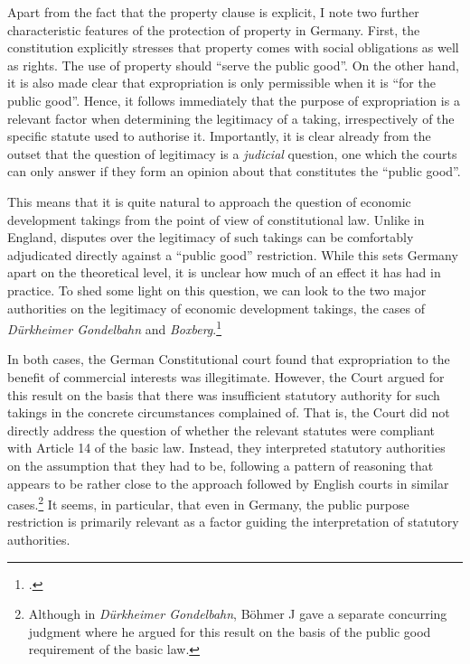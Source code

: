 \documentclass[12pt,a4paper]{book} %
\begin{document}
Apart from the fact that the property clause is explicit, I note two further characteristic features of the protection of property in Germany. First, the constitution explicitly stresses that property comes with social obligations as well as rights. The use of property should ``serve the public good''. On the other hand, it is also made clear that expropriation is only permissible when it is ``for the public good''. Hence, it follows immediately that the purpose of expropriation is a relevant factor when determining the legitimacy of a taking, irrespectively of the specific statute used to authorise it. Importantly, it is clear already from the outset that the question of legitimacy is a \emph{judicial} question, one which the courts can only answer if they form an opinion about that constitutes the ``public good''. 

This means that it is quite natural to approach the question of economic development takings from the point of view of constitutional law. Unlike in England, disputes over the legitimacy of such takings can be comfortably adjudicated directly against a ``public good'' restriction. While this sets Germany apart on the theoretical level, it is unclear how much of an effect it has had in practice. To shed some light on this question, we can look to the two major authorities on the legitimacy of economic development takings, the cases of {\it D\"{u}rkheimer Gondelbahn} and {\it Boxberg}.\footcite{durkheimer81,boxberg86} 

In both cases, the German Constitutional court found that expropriation to the benefit of commercial interests was illegitimate. However, the Court argued for this result on the basis that there was insufficient statutory authority for such takings in the concrete circumstances complained of. That is, the Court did not directly address the question of whether the relevant statutes were compliant with Article 14 of the basic law. Instead, they interpreted statutory authorities on the assumption that they had to be, following a pattern of reasoning that appears to be rather close to the approach followed by English courts in similar cases.\footnote{Although in {\it Dürkheimer Gondelbahn}, Böhmer J gave a separate concurring judgment where he argued for this result on the basis of the public good requirement of the basic law.} It seems, in particular, that even in Germany, the public purpose restriction is primarily relevant as a factor guiding the interpretation of statutory authorities.
\end{document}
